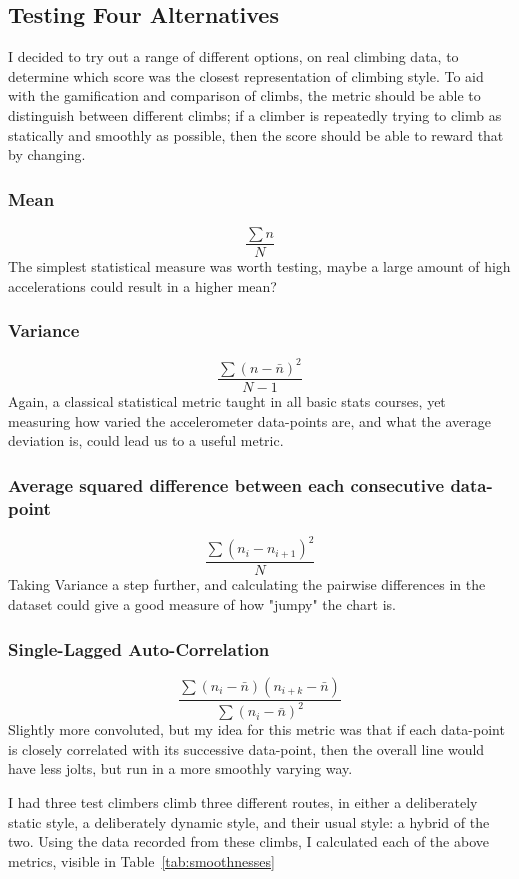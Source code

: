 \subsection{Testing Four Alternatives}
I decided to try out a range of different options, on real climbing data, to determine which score was the closest representation of climbing style.
To aid with the gamification and comparison of climbs, the metric should be able to distinguish between different climbs; if a climber is repeatedly trying to climb as statically and smoothly as possible, then the score should be able to reward that by changing.

\subsubsection{Mean}
$$\frac{\sum n }{N}$$
The simplest statistical measure was worth testing, maybe a large amount of high accelerations could result in a higher mean?

\subsubsection{Variance}
$$\frac{\sum (n - \bar{n} )^2 }{N-1}$$
Again, a classical statistical metric taught in all basic stats courses, yet measuring how varied the accelerometer data-points are, and what the average deviation is, could lead us to a useful metric.

\subsubsection{Average squared difference between each consecutive data-point}
$$\frac{\sum (n_i - n_{i+1} )^2 }{N}$$
Taking Variance a step further, and calculating the pairwise differences in the dataset could give a good measure of how "jumpy" the chart is.

\subsubsection{Single-Lagged Auto-Correlation}
$$
\frac{\sum(n_{i} - \bar{n})(n_{i+k} - \bar{n})}
      {\sum(n_{i} - \bar{n})^{2} }
$$
Slightly more convoluted, but my idea for this metric was that if each data-point is closely correlated with its successive data-point, then the overall line would have less jolts, but run in a more smoothly varying way.


I had three test climbers climb three different routes, in either a deliberately static style, a deliberately dynamic style, and their usual style: a hybrid of the two.
Using the data recorded from these climbs, I calculated each of the above metrics, visible in Table~\ref{tab:smoothnesses}


